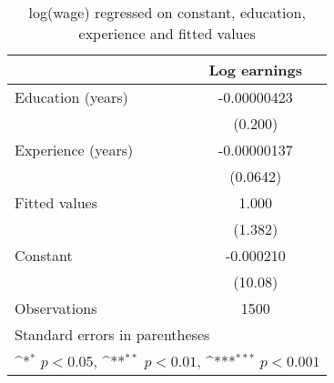 \begin{table}[htbp]\centering
\def\sym#1{\ifmmode^{#1}\else\(^{#1}\)\fi}
\caption{log(wage) regressed on constant, education, experience and fitted values}
\begin{tabular}{l*{1}{c}}
\hline\hline
                    &\multicolumn{1}{c}{Log earnings}\\
\hline
Education (years)   & -0.00000423         \\
                    &     (0.200)         \\
[1em]
Experience (years)  & -0.00000137         \\
                    &    (0.0642)         \\
[1em]
Fitted values       &       1.000         \\
                    &     (1.382)         \\
[1em]
Constant            &   -0.000210         \\
                    &     (10.08)         \\
\hline
Observations        &        1500         \\
\hline\hline
\multicolumn{2}{l}{\footnotesize Standard errors in parentheses}\\
\multicolumn{2}{l}{\footnotesize \sym{*} \(p<0.05\), \sym{**} \(p<0.01\), \sym{***} \(p<0.001\)}\\
\end{tabular}
\end{table}
